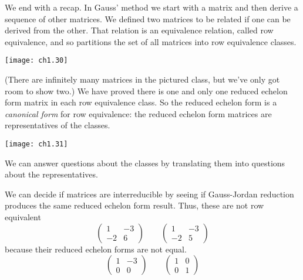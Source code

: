 We end with a recap.
In Gauss' method we start with a matrix and then
derive a sequence of other matrices.
We defined two matrices to be related if one can be derived from the other.
That relation is an equivalence relation, %
called row equivalence, and
so partitions the set of all matrices into row equivalence classes.
\begin{center}
  \texttt{[image: ch1.30]}
\end{center}
(There are infinitely many matrices in the pictured class, but we've only
got room to show two.)
We have proved there is one and only one reduced echelon form matrix in
each row equivalence class.
So the reduced echelon form is a
{\em canonical form}%
%
%
for row equivalence:
the reduced echelon form matrices are
representatives of the classes.
\begin{center}
  \texttt{[image: ch1.31]}
\end{center}
We can answer questions about the classes by translating them
into questions about the representatives.

\begin{example}  \label{ex:MatsNotRowEq}
We can decide if matrices are interreducible
by seeing if Gauss-Jordan reduction produces the same
reduced echelon form result.
Thus, these are not row equivalent
\begin{equation*}
  \begin{pmatrix}
    1  &-3  \\
   -2  &6
  \end{pmatrix}
  \qquad
  \begin{pmatrix}
    1  &-3  \\
   -2  &5
  \end{pmatrix}
\end{equation*}
because their reduced echelon forms are not equal.
\begin{equation*}
  \begin{pmatrix}
    1  &-3  \\
    0  &0
  \end{pmatrix}
  \qquad
  \begin{pmatrix}
    1  &0   \\
    0  &1
  \end{pmatrix}
\end{equation*}
\end{example}

